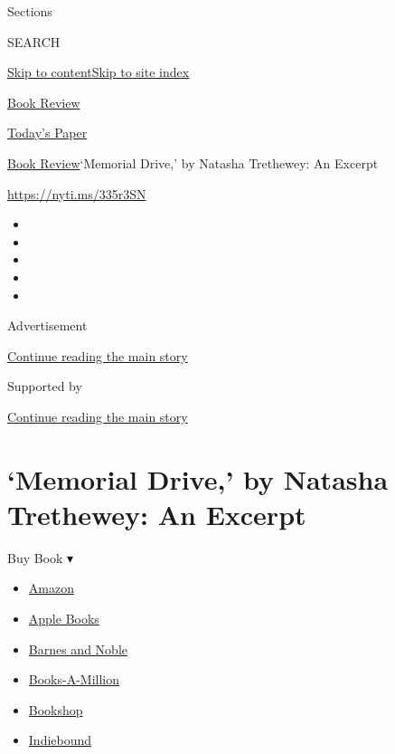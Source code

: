 Sections

SEARCH

\protect\hyperlink{site-content}{Skip to
content}\protect\hyperlink{site-index}{Skip to site index}

\href{https://www.nytimes3xbfgragh.onion/section/books/review}{Book
Review}

\href{https://myaccount.nytimes3xbfgragh.onion/auth/login?response_type=cookie\&client_id=vi}{}

\href{https://www.nytimes3xbfgragh.onion/section/todayspaper}{Today's
Paper}

\href{/section/books/review}{Book Review}\textbar{}`Memorial Drive,' by
Natasha Trethewey: An Excerpt

\url{https://nyti.ms/335r3SN}

\begin{itemize}
\item
\item
\item
\item
\item
\end{itemize}

Advertisement

\protect\hyperlink{after-top}{Continue reading the main story}

Supported by

\protect\hyperlink{after-sponsor}{Continue reading the main story}

\hypertarget{memorial-drive-by-natasha-trethewey-an-excerpt}{%
\section{`Memorial Drive,' by Natasha Trethewey: An
Excerpt}\label{memorial-drive-by-natasha-trethewey-an-excerpt}}

Buy Book ▾

\begin{itemize}
\tightlist
\item
  \href{https://www.amazon.com/gp/search?index=books\&tag=NYTBSREV-20\&field-keywords=Memorial+Drive\%3A+A+Daughter\%27s+Memoir+Natastha+Trethewey}{Amazon}
\item
  \href{https://du-gae-books-dot-nyt-du-prd.appspot.com/buy?title=Memorial+Drive\%3A+A+Daughter\%27s+Memoir\&author=Natastha+Trethewey}{Apple
  Books}
\item
  \href{https://www.anrdoezrs.net/click-7990613-11819508?url=https\%3A\%2F\%2Fwww.barnesandnoble.com\%2Fs\%2FMemorial+Drive\%3A+A+Daughter\%27s+Memoir+Natastha+Trethewey}{Barnes
  and Noble}
\item
  \href{https://www.anrdoezrs.net/click-7990613-35140?url=https\%3A\%2F\%2Fwww.booksamillion.com\%2Fsearch\%3Fquery\%3DMemorial\%2BDrive\%253A\%2BA\%2BDaughter\%2527s\%2BMemoir\%2BNatastha\%2BTrethewey}{Books-A-Million}
\item
  \href{https://bookshop.org/books?keywords=Memorial+Drive\%3A+A+Daughter\%27s+Memoir}{Bookshop}
\item
  \href{https://www.indiebound.org/search/book?searchfor=Memorial+Drive\%3A+A+Daughter\%27s+Memoir+Natastha+Trethewey\&aff=NYT}{Indiebound}
\end{itemize}

